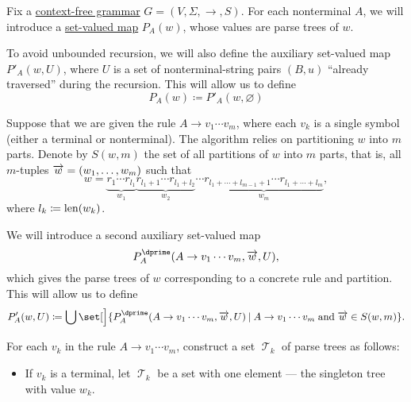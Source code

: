 \begin{algorithm}\label{alg:brute_force_parsing}
  Fix a \hyperref[def:chomsky_hierarchy/context_free]{context-free grammar} \( G = (V, \Sigma, \to, S) \). For each nonterminal \( A \), we will introduce a \hyperref[def:function]{set-valued map} \( P_A(w) \), whose values are parse trees of \( w \).

  To avoid unbounded recursion, we will also define the auxiliary set-valued map \( P'_A(w, U) \), where \( U \) is a set of nonterminal-string pairs \( (B, u) \) \enquote{already traversed} during the recursion. This will allow us to define
  \begin{equation*}
    P_A(w)
    \coloneqq
    P'_A(w, \varnothing)
  \end{equation*}

  Suppose that we are given the rule \( A \to v_1 \cdots v_m \), where each \( v_k \) is a single symbol (either a terminal or nonterminal). The algorithm relies on partitioning \( w \) into \( m \) parts. Denote by \( S(w, m) \) the set of all partitions of \( w \) into \( m \) parts, that is, all \( m \)-tuples \( \overrightarrow{w} = (w_1, \ldots, w_m) \) such that
  \begin{equation*}
    w = \underbrace{ r_1 \cdots r_{l_1} }_{w_1} \underbrace{ r_{l_1 + 1} \cdots r_{l_1 + l_2} }_{w_2} \cdots \underbrace{ r_{l_1 + \cdots + l_{m-1} + 1} \cdots r_{l_1 + \cdots + l_m} }_{w_m},
  \end{equation*}
  where \( l_k \coloneqq \operatorname{len}(w_k) \).

  We will introduce a second auxiliary set-valued map
  \begin{equation*}
    P^\dprime_A(A \to v_1 \cdots v_m, \vect w, U),
  \end{equation*}
  which gives the parse trees of \( w \) corresponding to a concrete rule and partition. This will allow us to define
  \begin{equation*}
    P'_A(w, U)
    \coloneqq
    \bigcup\set[\Big]{ P^\dprime_A(A \to v_1 \cdots v_m, \vect w, U) \given A \to v_1 \cdots v_m \T{and} \vect w \in S(w, m) }.
  \end{equation*}

  \begin{thmenum}
     For each \( v_k \) in the rule \( A \to v_1 \cdots v_m \), construct a set \( \mscrT_k \) of parse trees as follows:
    \begin{itemize}
      \item If \( v_k \) is a terminal, let \( \mscrT_k \) be a set with one element --- the singleton tree with value \( w_k \).


\end{itemize}
\end{thmenum}
\end{algorithm}

